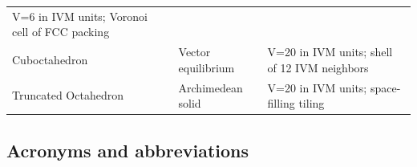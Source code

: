 \documentclass[
  10pt,
]{article}
\begin{document}
\begin{longtable}[]{@{}lll@{}}
\begin{minipage}[t]{0.30\columnwidth}
V=6 in IVM units; Voronoi cell of FCC packing\strut
\end{minipage}\tabularnewline
\begin{minipage}[t]{0.30\columnwidth}\raggedright
Cuboctahedron\strut
\end{minipage} & \begin{minipage}[t]{0.30\columnwidth}\raggedright
Vector equilibrium\strut
\end{minipage} & \begin{minipage}[t]{0.30\columnwidth}\raggedright
V=20 in IVM units; shell of 12 IVM neighbors\strut
\end{minipage}\tabularnewline
\begin{minipage}[t]{0.30\columnwidth}\raggedright
Truncated Octahedron\strut
\end{minipage} & \begin{minipage}[t]{0.30\columnwidth}\raggedright
Archimedean solid\strut
\end{minipage} & \begin{minipage}[t]{0.30\columnwidth}\raggedright
V=20 in IVM units; space-filling tiling\strut
\end{minipage}\tabularnewline
\bottomrule
\end{longtable}

\hypertarget{acronyms-and-abbreviations}{%
\subsection{Acronyms and
abbreviations}\label{acronyms-and-abbreviations}}
\end{document}
